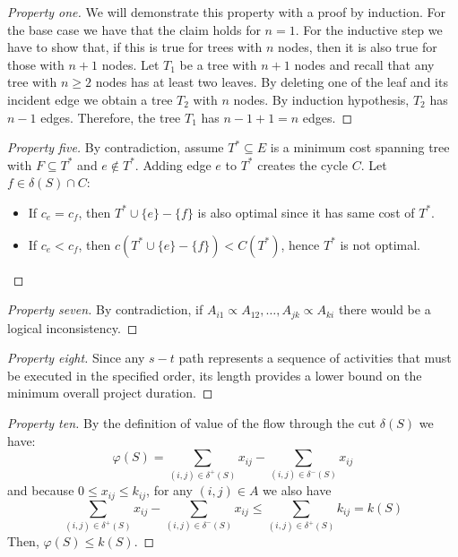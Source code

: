 \documentclass[12pt, a4paper]{report}
\newtheorem[style=M,bodystyle=\normalfont]{proposition}{Proposition}
\newtheorem[style=M,bodystyle=\normalfont]{theorem}{Theorem}
\newtheorem[style=M,bodystyle=\normalfont]{corollary}{Corollary}
\newtheorem[style=M,bodystyle=\normalfont]{lemma}{Lemma}
\newtheorem[style=M,bodystyle=\normalfont]{definition}{Definition}
\begin{document}
    \begin{proof}[Property one]
        We will demonstrate this property with a proof by induction. For the base case we have that the claim holds for $n=1$. 
        For the inductive step we have to show that, if this is true for trees with $n$ nodes, then it is also true for those with $n+1$ nodes. 
        Let $T_1$ be a tree with $n+1$ nodes and recall that any tree with $n \geq 2$ nodes has at least two leaves. By deleting one of the leaf and its incident edge we obtain
        a tree $T_2$ with $n$ nodes. By induction hypothesis, $T_2$ has $n-1$ edges. Therefore, the tree $T_1$ has $n-1+1=n$ edges. 
    \end{proof}
    \begin{proof}[Property five]
        By contradiction, assume $T^{*} \subseteq E$ is a minimum cost spanning tree with $F \subseteq T^{*}$ and $e \notin T^{*}$. Adding edge $e$ to $T^{*}$ creates the cycle
        $C$. Let $f \in \delta(S) \cap C$: 
        \begin{itemize}
            \item If $c_e=c_f$, then $T^{*}\cup\{e\}-\{f\}$ is also optimal since it has same cost of $T^{*}$.
            \item If $c_e<c_f$, then $c\left(T^{*}\cup\{e\}-\{f\}\right)<C(T^{*})$, hence $T^{*}$ is not optimal.
        \end{itemize}
    \end{proof}
    \begin{proof}[Property seven]
        By contradiction, if $A_{i1} \varpropto A_{12},\dots,A_{jk} \varpropto A_{ki}$ there would be a logical inconsistency. 
    \end{proof}  
    \begin{proof}[Property eight]
        Since any $s-t$ path represents a sequence of activities that must be executed in the specified order, its length provides a lower bound on the minimum overall
        project duration. 
    \end{proof}  
    \begin{proof}[Property ten]
        By the definition of value of the flow through the cut $\delta(S)$ we have:
        \[\varphi(S)=\sum_{(i,j) \in \delta^{+}(S)}x_{ij}-\sum_{(i,j) \in \delta^{-}(S)}x_{ij}\]
        and because $0 \leq x_{ij } \leq k_{ij}$, for any $(i, j) \in A$ we also have
        \[\sum_{(i,j) \in \delta^{+}(S)}x_{ij}-\sum_{(i,j) \in \delta^{-}(S)}x_{ij} \leq \sum_{(i,j) \in \delta^{+}(S)}k_{ij}=k(S)\]
        Then, $\varphi(S) \leq k(S)$.
    \end{proof}  
\end{document}
